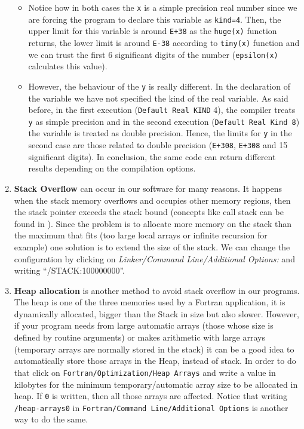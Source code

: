 \begin{enumerate}
\begin{IN}
    \begin{itemize}
\item Notice how in both cases the \verb|x| is a simple precision real number since we are forcing the program to declare this variable as \verb|kind=4|. Then, the upper limit for this variable is around \texttt{E+38} as the \verb|huge(x)| function returns, the lower limit is around \texttt{E-38} according to \verb|tiny(x)| function and we can trust the first 6 significant digits of the number (\verb|epsilon(x)| calculates this value). 

\item However, the behaviour of the \verb|y| is really different. In the declaration of the variable we have not specified the kind of the real variable. As said before, in the first execution (\texttt{Default Real KIND} 4), the compiler treats \verb|y| as simple precision and in the second execution (\texttt{Default Real Kind 8}) the variable is treated as double precision. Hence, the limits for \verb|y| in the second case are those related to double precision (\texttt{E+308}, \texttt{E+308} and 15 significant digits). In conclusion, the same code can return different results depending on the compilation options.
    \end{itemize}
\end{IN}   
    

    \item \textbf{Stack Overflow} can occur in our software for many reasons. It happens when the stack memory overflows and occupies other memory regions, then the stack pointer exceeds the stack bound \citep{stack} (concepts like call stack can be found in \citep{stack2}). Since the problem is to allocate more memory on the stack than the maximum that fits (too large local arrays or infinite recursion for example) one solution is to extend the size of the stack. We can change the configuration by clicking on \textit{Linker/Command Line/Additional Options:} and writing ``/STACK:100000000''.
    
    \item \textbf{Heap allocation} is another method to avoid stack overflow in our programs. The heap is one of the three memories used by a Fortran application, it is dynamically allocated, bigger than the Stack in size but also slower. However, if your program needs from large automatic arrays (those whose size is defined by routine arguments) or makes arithmetic with large arrays (temporary arrays are normally stored in the stack) it can be a good idea to automatically store those arrays in the Heap, instead of stack. In order to do that click on \texttt{Fortran/Optimization/Heap Arrays} and write a value in kilobytes for the minimum temporary/automatic array size to be allocated in heap. If \texttt{0} is written, then all those arrays are affected. Notice that writing \texttt{/heap-arrays0} in \texttt{Fortran/Command Line/Additional Options} is another way to do the same. 
    

\end{enumerate}
